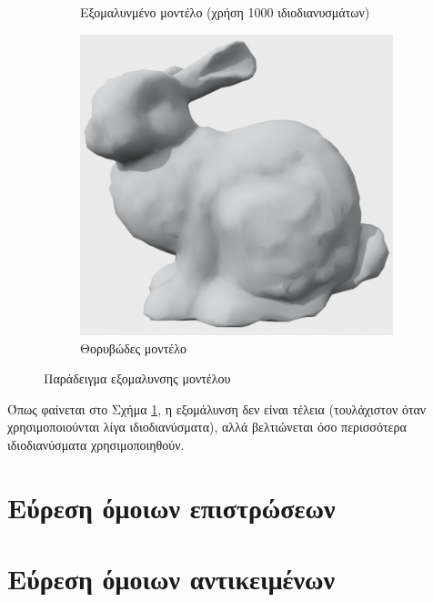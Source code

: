 \documentclass[draft]{article}
\begin{document}
\begin{figure}[h]
\begin{subfigure}{0.4\textwidth}
		\caption{Εξομαλυνμένο μοντέλο (χρήση 1000 ιδιοδιανυσμάτων)}
	\end{subfigure}
	\begin{subfigure}{0.4\textwidth}
		\includegraphics[width=\textwidth]{"noisy_mesh.png"}
		\caption{Θορυβώδες μοντέλο}
	\end{subfigure}
	\caption{Παράδειγμα εξομαλυνσης μοντέλου}
	\label{fig:simplify}
\end{figure}

Όπως φαίνεται στο Σχήμα \ref{fig:simplify}, η εξομάλυνση δεν είναι τέλεια
(τουλάχιστον όταν χρησιμοποιούνται λίγα ιδιοδιανύσματα), αλλά βελτιώνεται όσο
περισσότερα ιδιοδιανύσματα χρησιμοποιηθούν.

\section{Εύρεση όμοιων επιστρώσεων}


\section{Εύρεση όμοιων αντικειμένων}

\end{document}
